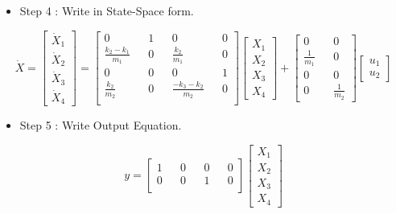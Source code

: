 \begin{itemize}
	\item Step 4 : Write in State-Space form.
\end{itemize}
\[
\dot{X} = 
\begin{bmatrix}
	\dot{X}_1 \\
	\dot{X}_2 \\
	\dot{X}_3 \\
	\dot{X}_4 
\end{bmatrix} =
\begin{bmatrix}
	0                     &   & 1 &   & 0                      &   & 0 \\
	\frac{k_2 - k_1}{m_1} &   & 0 &   & \frac{k_2}{m_1}        &   & 0 \\
	0                     &   & 0 &   & 0                      &   & 1 \\
	\frac{k_2}{m_2}       &   & 0 &   & \frac{-k_3 - k_2}{m_2} &   & 0 \\
\end{bmatrix}
\begin{bmatrix}
	X_1 \\
	X_2 \\
	X_3 \\
	X_4 
\end{bmatrix} +
\begin{bmatrix}
	0             &   & 0             \\
	\frac{1}{m_1} &   & 0             \\
	0             &   & 0             \\
	0             &   & \frac{1}{m_2} 
\end{bmatrix}
\begin{bmatrix}
	u_1 \\
	u_2 
\end{bmatrix}
\]
\begin{itemize}
	\item Step 5 : Write Output Equation.
\end{itemize}
\[
y =
\begin{bmatrix}
	1 &   & 0 &   & 0 &   & 0 \\ 
	0 &   & 0 &   & 1 &   & 0 \\ 
\end{bmatrix}
\begin{bmatrix}
	X_1 \\
	X_2 \\
	X_3 \\
	X_4 
\end{bmatrix}
\]

